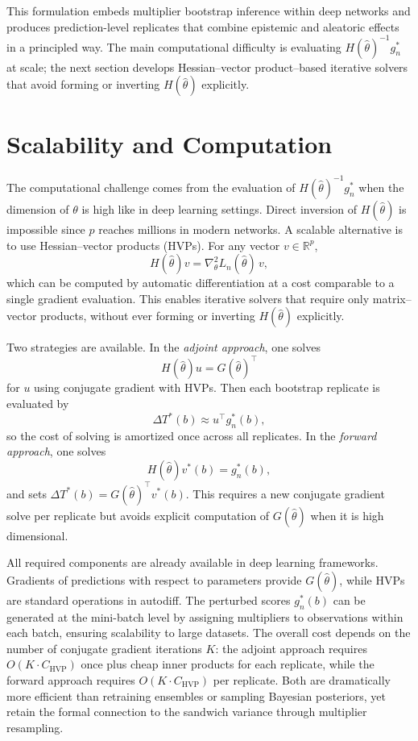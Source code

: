 \documentclass[12pt, titlepage, reqno]{article}
\begin{document}
This formulation embeds multiplier bootstrap inference within deep
networks and produces prediction-level replicates that combine epistemic
and aleatoric effects in a principled way. The main computational
difficulty is evaluating $H(\hat{\theta})^{-1}g_n^*$ at scale; the next
section develops Hessian–vector product–based iterative solvers that
avoid forming or inverting $H(\hat{\theta})$ explicitly.


\section{Scalability and Computation}

The computational challenge comes from the evaluation of
$H(\hat{\theta})^{-1}g_n^*$ when the dimension of $\theta$ is high
like in deep learning settings.
Direct inversion of $H(\hat{\theta})$ is impossible since $p$ reaches
millions in modern networks. A scalable alternative is to use
Hessian–vector products (HVPs). For any vector $v \in \mathbb{R}^p$,
\[
H(\hat{\theta})v = \nabla_\theta^2 L_n(\hat{\theta})\,v,
\]
which can be computed by automatic differentiation at a cost comparable
to a single gradient evaluation. This enables iterative solvers that
require only matrix–vector products, without ever forming or inverting
$H(\hat{\theta})$ explicitly.


Two strategies are available. In the \emph{adjoint approach}, one solves
\[
H(\hat{\theta})u = G(\hat{\theta})^\top
\]
for $u$ using conjugate gradient with HVPs. Then each bootstrap replicate
is evaluated by
\[
\Delta T^*(b) \approx u^\top g_n^*(b),
\]
so the cost of solving is amortized once across all replicates. In the
\emph{forward approach}, one solves
\[
H(\hat{\theta})v^*(b) = g_n^*(b),
\]
and sets $\Delta T^*(b)=G(\hat{\theta})^\top v^*(b)$. This requires a
new conjugate gradient solve per replicate but avoids explicit
computation of $G(\hat{\theta})$ when it is high dimensional.


All required components are already available in deep learning
frameworks. Gradients of predictions with respect to parameters provide
$G(\hat{\theta})$, while HVPs are standard operations in autodiff. The
perturbed scores $g_n^*(b)$ can be generated at the mini-batch level by
assigning multipliers to observations within each batch, ensuring
scalability to large datasets. The overall cost depends on the number of
conjugate gradient iterations $K$: the adjoint approach requires
$O(K\cdot C_{\text{HVP}})$ once plus cheap inner products for each
replicate, while the forward approach requires $O(K\cdot C_{\text{HVP}})$
per replicate. Both are dramatically more efficient than retraining
ensembles or sampling Bayesian posteriors, yet retain the formal
connection to the sandwich variance through multiplier resampling.
\end{document}
